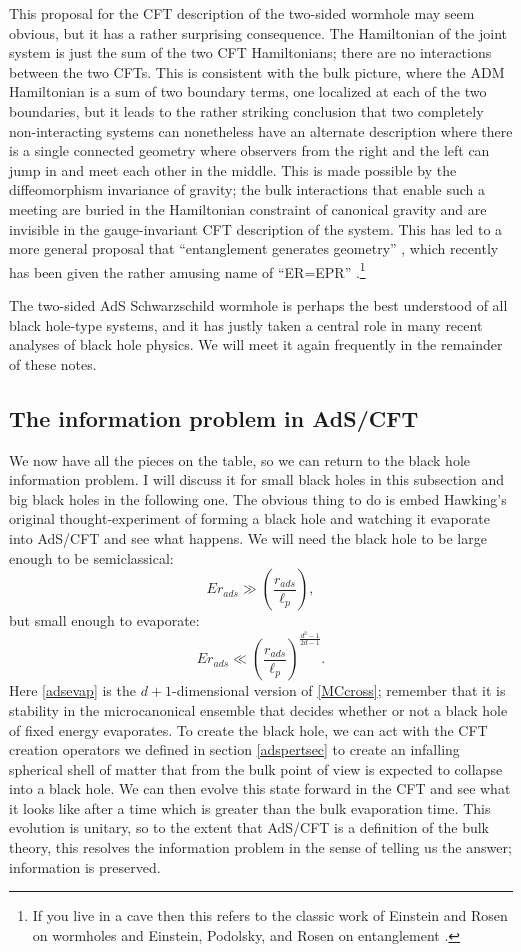 \documentclass[12pt]{article}
\newcommand{\be}{\begin{equation}}
\newcommand{\ee}{\end{equation}}
\begin{document}
This proposal for the CFT description of the two-sided wormhole may seem obvious, but it has a rather surprising consequence.  The Hamiltonian of the joint system is just the sum of the two CFT Hamiltonians; there are no interactions between the two CFTs.  This is consistent with the bulk picture, where the ADM Hamiltonian is a sum of two boundary terms, one localized at each of the two boundaries, but it leads to the rather striking conclusion that two completely non-interacting systems can nonetheless have an alternate description where there is a single connected geometry where observers from the right and the left can jump in and meet each other in the middle.  This is made possible by the diffeomorphism invariance of gravity; the bulk interactions that enable such a meeting are buried in the Hamiltonian constraint of canonical gravity and are invisible in the gauge-invariant CFT description of the system.  This has led to a more general proposal that ``entanglement generates geometry'' \cite{VanRaamsdonk:2010pw}, which recently has been given the rather amusing name of ``ER=EPR'' \cite{Maldacena:2013xja}.\footnote{If you live in a cave then this refers to the classic work of Einstein and Rosen on wormholes and Einstein, Podolsky, and Rosen on entanglement \cite{Einstein:1935tc,Einstein:1935rr}.}

The two-sided AdS Schwarzschild wormhole is perhaps the best understood of all black hole-type systems, and it has justly taken a central role in many recent analyses of black hole physics.  We will meet it again frequently in the remainder of these notes.  

\subsection{The information problem in AdS/CFT}
We now have all the pieces on the table, so we can return to the black hole information problem.  I will discuss it for small black holes in this subsection and big black holes in the following one.  The obvious thing to do is embed Hawking's original thought-experiment of forming a black hole and watching it evaporate into AdS/CFT and see what happens.  We will need the black hole to be large enough to be semiclassical:
\be\label{adssc}
E r_{ads}\gg \left(\frac{r_{ads}}{\ell_p}\right),
\ee
but small enough to evaporate:
\be\label{adsevap}
E r_{ads}\ll \left(\frac{r_{ads}}{\ell_p}\right)^{\frac{d^2-1}{2d-1}}.
\ee
Here \eqref{adsevap} is the $d+1$-dimensional version of \eqref{MCcross}; remember that it is stability in the microcanonical ensemble that decides whether or not a black hole of fixed energy evaporates.  To create the black hole, we can act with the CFT creation operators we defined in section \ref{adspertsec} to create an infalling spherical shell of matter that from the bulk point of view is expected to collapse into a black hole.  We can then evolve this state forward in the CFT and see what it looks like after a time which is greater than the bulk evaporation time.  This evolution is unitary, so to the extent that AdS/CFT is a definition of the bulk theory, this resolves the information problem in the sense of telling us the answer; information is preserved.  
\end{document}
